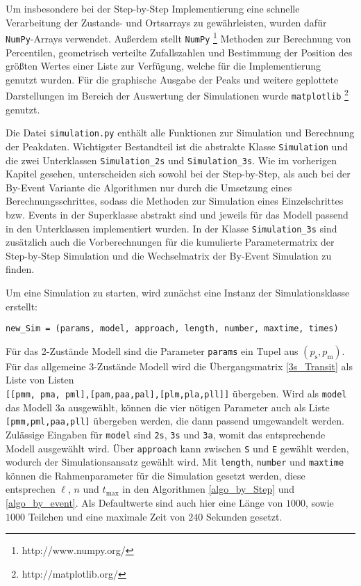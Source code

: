 Um insbesondere bei der Step-by-Step Implementierung eine schnelle Verarbeitung der Zustands- und Ortsarrays zu gewährleisten, wurden dafür \texttt{NumPy}-Arrays verwendet. Außerdem stellt \texttt{NumPy} \footnote{http://www.numpy.org/} Methoden zur Berechnung von Percentilen, geometrisch verteilte Zufallszahlen und Bestimmung der Position des größten Wertes einer Liste zur Verfügung, welche für die Implementierung genutzt wurden.
Für die graphische Ausgabe der Peaks und weitere geplottete Darstellungen im Bereich der Auswertung der Simulationen wurde \texttt{matplotlib} \footnote{http://matplotlib.org/} genutzt.


Die Datei \texttt{simulation.py} enthält alle Funktionen zur Simulation und Berechnung der Peakdaten. Wichtigster Bestandteil ist die abstrakte Klasse \texttt{Simulation} und die zwei Unterklassen \texttt{Simulation\_2s} und \texttt{Simulation\_3s}. Wie im vorherigen Kapitel gesehen, unterscheiden sich sowohl bei der Step-by-Step, als auch bei der By-Event Variante die Algorithmen nur durch die Umsetzung eines Berechnungsschrittes, sodass die Methoden zur Simulation eines Einzelschrittes bzw. Events in der Superklasse abstrakt sind und jeweils für das Modell passend in den Unterklassen implementiert wurden. In der Klasse \verb!Simulation_3s! sind zusätzlich auch die Vorberechnungen für die kumulierte Parametermatrix der Step-by-Step Simulation und die Wechselmatrix der By-Event Simulation zu finden.

Um eine Simulation zu starten, wird zunächst eine Instanz der Simulationsklasse erstellt:
\begin{verbatim}
new_Sim = (params, model, approach, length, number, maxtime, times)
\end{verbatim}                                                                                                  
Für das 2-Zustände Modell sind die Parameter \verb!params! ein Tupel aus $(p_\text{s}, p_\text{m})$. Für das allgemeine 3-Zustände Modell wird die Übergangsmatrix \ref{3s_Transit} als Liste von Listen \\ \verb![[pmm, pma, pml],[pam,paa,pal],[plm,pla,pll]]! übergeben. Wird als \verb!model! das Modell 3a ausgewählt, können die vier nötigen Parameter auch als Liste \verb![pmm,pml,paa,pll]! übergeben werden, die dann passend umgewandelt werden.
Zulässige Eingaben für \verb!model! sind \texttt{2s}, \texttt{3s} und \texttt{3a}, womit das entsprechende Modell ausgewählt wird. Über \verb!approach! kann zwischen \texttt{S} und \texttt{E} gewählt werden, wodurch der Simulationsansatz gewählt wird.
Mit \verb!length!, \verb!number! und \verb!maxtime! können die Rahmenparameter für die Simulation gesetzt werden, diese entsprechen $\ell$, $n$ und $t_{\text{max}}$ in den Algorithmen \ref{algo_by_Step} und \ref{algo_by_event}. Als Defaultwerte sind auch hier eine Länge von $1000$, sowie $1000$ Teilchen und eine maximale Zeit von $240$ Sekunden gesetzt.

